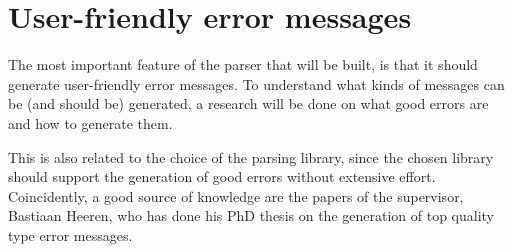 
\section{User-friendly error messages}
\label{sec:errors}
The most important feature of the parser that will be built, is that it should generate user-friendly error messages.
To understand what kinds of messages can be (and should be) generated, a research will be done on what good errors are and how to generate them.

This is also related to the choice of the parsing library, since the chosen library should support the generation of good errors without extensive effort.
Coincidently, a good source of knowledge are the papers of the supervisor, Bastiaan Heeren, who has done his PhD thesis on the generation of top quality type error messages\cite{heeren-error}.
